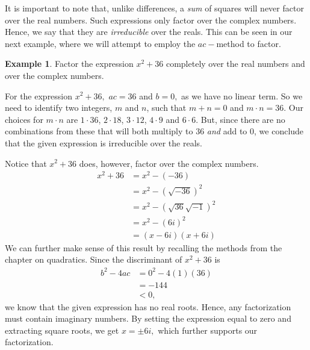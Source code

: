 \documentclass[12pt]{book}
\theoremstyle{definition}
\newtheorem{example}{Example}
\begin{document}
It is important to note that, unlike differences, a {\it sum} of squares will never factor over the real numbers.  Such expressions only factor over the complex numbers.  Hence, we say that they are {\it irreducible} over the reals. This can be seen in our next example, where we will attempt to employ the $ac-$method to factor.
\begin{example} Factor the expression $x^2+36$ completely over the real numbers and over the complex numbers.
\par
For the expression $x^2+36,$ $ac=36$ and $b=0,$ as we have no linear term.  So we need to identify two integers, $m$ and $n$, such that $m+n=0$ and $m\cdot n=36$.  Our choices for $m\cdot n$ are $1 \cdot 36$, $2 \cdot 18$, $3 \cdot 12$, $4 \cdot 9$ and $6 \cdot 6$.  But, since there are no combinations from these that will both multiply to 36 {\it and} add to 0, we conclude that the given expression is irreducible over the reals.
\par
Notice that $x^2+36$ does, however, factor over the complex numbers.
	\begin{equation*}
	\begin{split}
	x^2+36 &= x^2-\left(-36\right)\\
	&= x^2-\left(\sqrt{-36}\right)^2\\
	&= x^2-\left(\sqrt{36}\sqrt{-1}\right)^2\\
	&= x^2-\left(6i\right)^2\\
	&= \left(x-6i\right)\left(x+6i\right)
	\end{split}
	\end{equation*}
We can further make sense of this result by recalling the methods from the chapter on quadratics.  Since the discriminant of $x^2+36$ is 
\begin{equation*}
	\begin{split}
		b^2-4ac&=0^2-4\left(1\right)\left(36\right)\\
		&=-144\\
		&<0,
	\end{split}
\end{equation*}
we know that the given expression has no real roots.  Hence, any factorization must contain imaginary numbers.  By setting the expression equal to zero and extracting square roots, we get $x=\pm 6i,$ which further supports our factorization.
\end{example}
\end{document}
